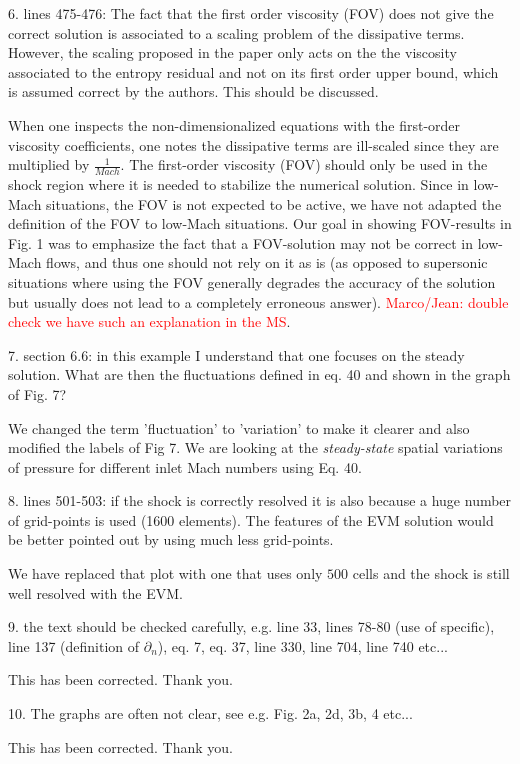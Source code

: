 \documentclass{article}
\newcommand{\tcr}[1]{\textcolor{red}{#1}}
\begin{document}
{
\color{blue}
6. lines 475-476: The fact that the first order viscosity (FOV)  does not give the correct solution is associated to a scaling problem of the dissipative terms. However, the scaling proposed in the paper only acts on the the viscosity associated to the entropy residual and not on its first order upper bound, which is assumed correct by the authors. This should be discussed.
}

When one inspects the non-dimensionalized equations with the first-order viscosity coefficients, one notes the dissipative terms are ill-scaled since they are multiplied by $\frac{1}{Mach}$. The first-order viscosity (FOV) should only be used in the shock region where it is needed to stabilize the numerical solution. Since in low-Mach situations, the FOV is not expected to be active, we have not adapted the definition of the FOV to low-Mach situations. Our goal in showing FOV-results in Fig. 1 was to emphasize the fact that a FOV-solution may not be correct in low-Mach flows, and thus one should not rely on it as is (as opposed to supersonic situations where using the FOV generally degrades the accuracy of the solution but usually does not lead to a completely erroneous answer). \tcr{Marco/Jean: double check we have such an explanation in the MS}.
\bigskip


{
\color{blue}
7. section 6.6: in this example I understand that one focuses on the steady solution. What are then the fluctuations defined in eq. 40 and shown in the graph of Fig. 7?
}

We changed the term 'fluctuation' to 'variation' to make it clearer and also modified the labels of Fig 7. We are looking at the \emph{steady-state} spatial variations of pressure for different inlet Mach numbers using Eq. 40.
\bigskip


{
\color{blue}
8. lines 501-503: if the shock is correctly resolved it is also because a huge number of grid-points is used (1600 elements). The features  of the EVM solution would be better pointed out by using much less grid-points.
}

We have replaced that plot with one that uses only $500$ cells and the shock is still well resolved with the EVM.
\bigskip


{
\color{blue}
9. the text should be checked carefully, e.g. line 33, lines 78-80 (use of specific), line 137 (definition of $\partial_n$), eq. 7, eq. 37, line 330, line 704, line 740 etc...
}

This has been corrected. Thank you.
\bigskip


{
\color{blue}
10. The graphs are often not clear, see e.g. Fig. 2a, 2d, 3b, 4 etc...
}

This has been corrected. Thank you.
\bigskip
\end{document}
